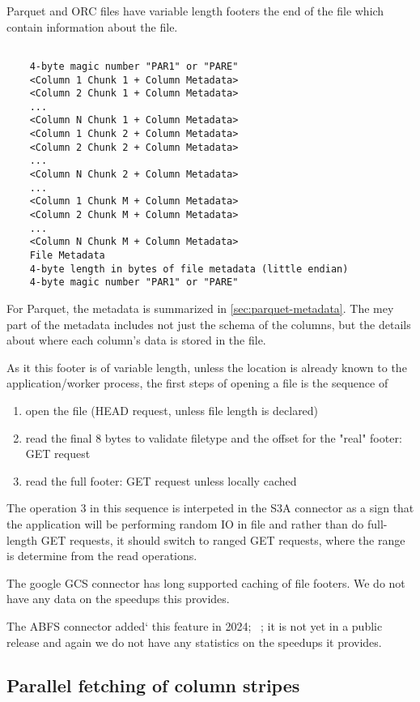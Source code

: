 \documentclass[manuscript]{acmart}
\begin{document}
Parquet and ORC files have variable length footers the end of the file which contain
information about the file.

\begin{verbatim}

    4-byte magic number "PAR1" or "PARE"
    <Column 1 Chunk 1 + Column Metadata>
    <Column 2 Chunk 1 + Column Metadata>
    ...
    <Column N Chunk 1 + Column Metadata>
    <Column 1 Chunk 2 + Column Metadata>
    <Column 2 Chunk 2 + Column Metadata>
    ...
    <Column N Chunk 2 + Column Metadata>
    ...
    <Column 1 Chunk M + Column Metadata>
    <Column 2 Chunk M + Column Metadata>
    ...
    <Column N Chunk M + Column Metadata>
    File Metadata
    4-byte length in bytes of file metadata (little endian)
    4-byte magic number "PAR1" or "PARE"
\end{verbatim}

For Parquet, the metadata is summarized in \ref{sec:parquet-metadata}.
The mey part of the metadata includes not just the schema of
the columns, but the details about where each column's data is stored
in the file.

As it this footer is of variable length, unless the location is already known
to the application/worker process, the first steps of opening a file
is the sequence of

\begin{enumerate}
  \item{open the file (HEAD request, unless file length is declared)}
  \item{read the final 8 bytes to validate filetype and the offset for the "real" footer: GET request}
  \item{read the full footer: GET request unless locally cached}
\end{enumerate}

The operation 3 in this sequence is interpeted in the S3A connector as a sign
that the application will be performing random IO in file and rather than do full-length GET requests,
it should switch to ranged GET requests, where the range is determine from the read operations.

The google GCS connector has long supported caching of file footers.
We do not have any data on the speedups this provides.

The ABFS connector added` this feature in 2024;
\ \cite{HADOOP-18971}; it is not yet in a public release and
again we do not have any statistics on the speedups it provides.


\subsection{Parallel fetching of column stripes}
\end{document}
